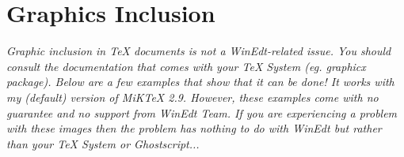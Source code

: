 \documentclass{article}
\begin{document}
\section{Graphics Inclusion}

\emph{Graphic inclusion in TeX documents is not a WinEdt-related issue. You
should consult the documentation that comes with your TeX System (eg.
graphicx package). Below are a few examples that show that it can be done! It
works with my (default) version of MiKTeX 2.9. However, these examples come
with no guarantee and no support from WinEdt Team. If you are experiencing a
problem with these images then the problem has nothing to do with WinEdt but
rather than your TeX System or Ghostscript...}
\end{document}
